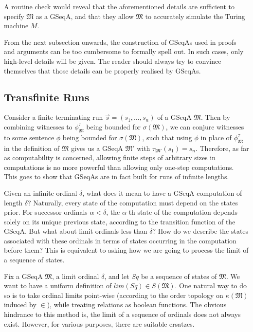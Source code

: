 \documentclass[12pt]{article}
\numberwithin{equation}{section}
\begin{document}
\begin{ex}
A routine check would reveal that the aforementioned details are sufficient to specify $\mathfrak{M}$ as a GSeqA, and that they allow $\mathfrak{M}$ to accurately simulate the Turing machine $M$. 
\end{ex}

From the next subsection onwards, the construction of GSeqAs used in proofs and arguments can be too cumbersome to formally spell out. In such cases, only high-level details will be given. The reader should always try to convince themselves that those details can be properly realised by GSeqAs.

\subsection{Transfinite Runs}

Consider a finite terminating run $\Vec{s} = (s_1, \dots, s_n)$ of a GSeqA $\mathfrak{M}$. Then by combining witnesses to $\phi^{\tau}_{\mathfrak{M}}$ being bounded for $\sigma(\mathfrak{M})$, we can conjure witnesses to some sentence $\phi$ being bounded for $\sigma(\mathfrak{M})$, such that using $\phi$ in place of $\phi^{\tau}_{\mathfrak{M}}$ in the definition of $\mathfrak{M}$ gives us a GSeqA $\mathfrak{M}'$ with $\tau_{\mathfrak{M}'}(s_1) = s_n$. Therefore, as far as computability is concerned, allowing finite steps of arbitrary sizes in computations is no more powerful than allowing only one-step computations. This goes to show that
GSeqAs are in fact built for runs of infinite lengths.

Given an infinite ordinal $\delta$, what does it mean to have a GSeqA computation of length $\delta$? Naturally, every state of the computation must depend on the states prior. For successor ordinals $\alpha < \delta$, the $\alpha$-th state of the computation depends solely on its unique previous state, according to the transition function of the GSeqA. But what about limit ordinals less than $\delta$? How do we describe the states associated with these ordinals in terms of states occurring in the computation before them? This is equivalent to asking how we are going to process the limit of a sequence of states.

Fix a GSeqA $\mathfrak{M}$, a limit ordinal $\delta$, and let $Sq$ be a sequence of states of $\mathfrak{M}$. We want to have a uniform definition of $lim(Sq) \in S(\mathfrak{M})$. One natural way to do so is to take ordinal limits point-wise (according to the order topology on $\kappa(\mathfrak{M})$ induced by $\in$), while treating relations as boolean functions. The obvious hindrance to this method is, the limit of a sequence of ordinals does not always exist. However, for various purposes, there are suitable ersatzes.
\end{document}
